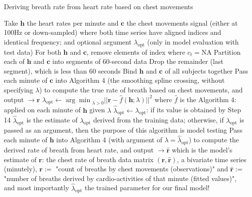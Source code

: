 \documentclass[
]{article}
\begin{document}
\begin{algorithm}
\caption{Deriving breath rate from heart rate based on chest movements}
\begin{algorithmic}[1]
\STATE Take $\mathbf{h}$ the heart rates per minute and $\mathbf{c}$ the chest movements signal (either at 100Hz or down-sampled) where both time series have aligned indices and identical frequency; and optional argument $\lambda_\text{opt}$ (only in model evaluation with test data)
\STATE For both $\mathbf{h}$ and $\mathbf{c}$, remove elements of index where $c_t = \text{NA}$
\STATE Partition each of $\mathbf{h}$ and $\mathbf{c}$ into segments of 60-second data
\ENDFOR
\STATE Drop the remainder (last segment), which is less than 60 seconds
\STATE Bind $\mathbf{h}$ and $\mathbf{c}$ of all subjects together
\ENDIF
{}
\STATE Pass each minute of $\mathbf{c}$ into Algorithm 4 (the smoothing spline crossing, without specifying $\lambda$) to compute the true rate of breath based on chest movements, and output $\rightarrow \mathbf{r}$
\ENDFOR
{}
\STATE $\lambda_\text{opt} \leftarrow {\arg\min}_{\lambda > 0} ||\mathbf{r} - \hat{f}(\mathbf{h}; \lambda)||^2$ where $\hat{f}$ is the Algorithm 4: applied on each minute of $\mathbf{h}$ given $\lambda$
\ENDIF
\STATE $\hat{\lambda}_\text{opt} \leftarrow \lambda_\text{opt}$: if its value is obtained by Step 14 $\hat{\lambda}_\text{opt}$ is the estimate of $\lambda_\text{opt}$ derived from the training data; otherwise, if $\lambda_\text{opt}$ is passed as an argument, then the purpose of this algorithm is model testing
\STATE Pass each minute of $\mathbf{h}$ into Algorithm 4 (with argument of $\lambda = \hat{\lambda}_\text{opt}$) to compute the derived rate of breath from heart rate, and output $\rightarrow \mathbf{\hat{r}}$ which is the model's estimate of $\mathbf{r}$: the chest rate of breath
\ENDFOR
\RETURN data matrix $(\mathbf{r}, \mathbf{\hat{r}})$, a bivariate time series (minutely), $\mathbf{r} :=$ "count of breaths by chest movements (observations)" and $\mathbf{\hat{r}} :=$ "number of breaths derived by cardio-activities of that minute (fitted values)", and most importantly $\hat{\lambda}_\text{opt}$ the trained parameter for our final model!
\end{algorithmic}
\end{algorithm}
\end{document}
